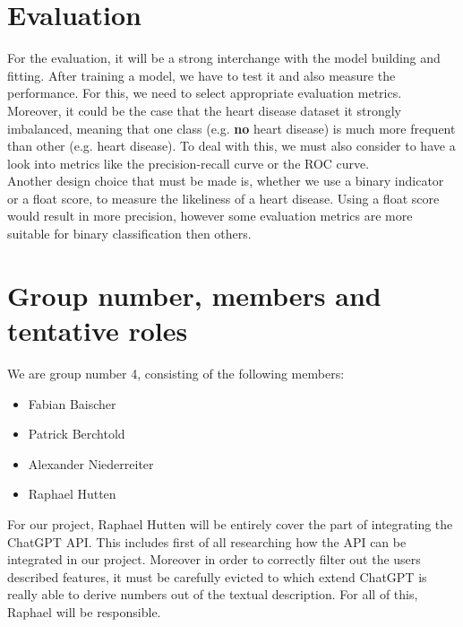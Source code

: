 \documentclass{article}
\begin{document}
\newpage


\section{Evaluation}

For the evaluation, it will be a strong interchange with the model building and fitting. After training a model, we have to test it and also measure the performance. For this, we need to select appropriate evaluation metrics. Moreover, it could be the case that the heart disease dataset it strongly imbalanced, meaning that one class (e.g. \textbf{no} heart disease) is much more frequent than other (e.g. heart disease). To deal with this, we must also consider to have a look into metrics like the precision-recall curve or the ROC curve.\\
Another design choice that must be made is, whether we use a binary indicator or a float score, to measure the likeliness of a heart disease. Using a float score would result in more precision, however some evaluation metrics are more suitable for binary classification then others.

\section{Group number, members and tentative roles}

We are group number 4, consisting of the following members:
\begin{itemize}
    \item Fabian Baischer
    \item Patrick Berchtold
    \item Alexander Niederreiter
    \item Raphael Hutten
\end{itemize}

For our project, Raphael Hutten will be entirely cover the part of integrating the ChatGPT API. This includes first of all researching how the API can be integrated in our project. Moreover in order to correctly filter out the users described features, it must be carefully evicted to which extend ChatGPT is really able to derive numbers out of the textual description. For all of this, Raphael will be responsible.
\vspace{1em}
\end{document}
